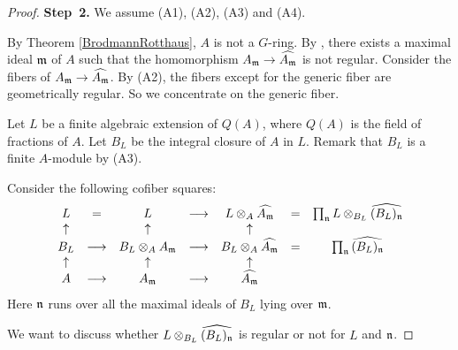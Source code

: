 \documentclass[11pt,a4paper]{amsart}
\theoremstyle{definition}
\theoremstyle{remark}
\newcommand{\fm}{\frak{m}}
\newcommand{\fn}{\frak{n}}
\begin{document}
\begin{proof}
\noindent
{\bf Step~2.}
We assume (A1), (A2), (A3) and  (A4).

By Theorem \ref{BrodmannRotthaus}, $A$ is not a $G$-ring.
By \cite[Theorem 75]{Ma80},
there exists a maximal ideal $\fm$ of $A$ such that 
the homomorphism $A_{\fm} \rightarrow \widehat{A_{\fm}}$
is not regular. Consider the fibers of $A_{\fm} \rightarrow \widehat{A_{\fm}}$. By (A2), the fibers except for the generic fiber are geometrically regular. So we concentrate on the generic fiber.

Let $L$ be a finite algebraic extension of $Q(A)$, 
where $Q(A)$ is the field of fractions of $A$.
Let $B_{L}$ be the integral closure of $A$ in $L$.
Remark that $B_L$ is a finite $A$-module by (A3).

Consider the following cofiber squares:
\[
\begin{array}{ccccccc}
L & = & L & \longrightarrow & L\otimes_{A}\widehat{A_{\fm}} & = & 
\prod_{\fn} L \otimes_{B_{L}} \widehat{(B_{L})_{\fn}} \\
\uparrow & & \uparrow & & \uparrow & & \\
B_{L} & \longrightarrow & B_{L} \otimes_{A}A_{\fm} & \longrightarrow &
B_{L} \otimes_{A} \widehat{A_{\fm}} & = & \prod_\fn \widehat{(B_{L})_{\fn}} \\
\uparrow & & \uparrow & & \uparrow & & \\
A & \longrightarrow & A_\fm  & \longrightarrow & \widehat{A_\fm} 
\end{array}
\]
Here $\fn$ runs over all the maximal ideals of $B_L$ lying over $\fm$.

We want to discuss whether $L \otimes_{B_{L}} \widehat{(B_{L})_{\fn}}$ is regular or not for $L$ and $\fn$.


\end{proof}
\end{document}
